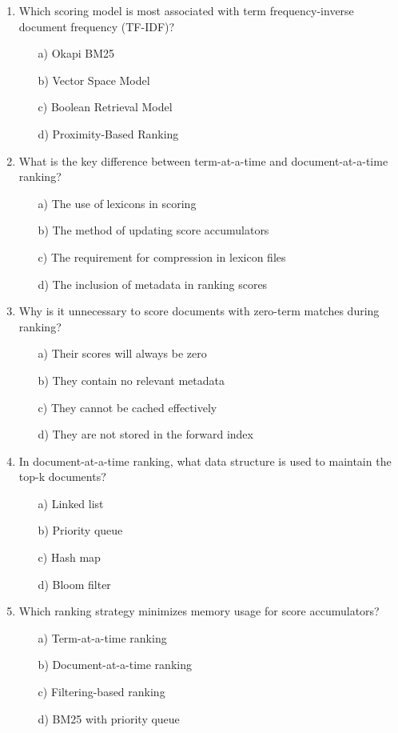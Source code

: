 \documentclass[8pt]{extarticle}
\begin{document}
\begin{multicols}{2}
\begin{enumerate}
\item Which scoring model is most associated with term frequency-inverse document frequency (TF-IDF)?
\begin{itemize}
\item[a)] Okapi BM25
\item[b)] Vector Space Model
\item[c)] Boolean Retrieval Model
\item[d)] Proximity-Based Ranking
\end{itemize}

\item What is the key difference between term-at-a-time and document-at-a-time ranking?
\begin{itemize}
\item[a)] The use of lexicons in scoring
\item[b)] The method of updating score accumulators
\item[c)] The requirement for compression in lexicon files
\item[d)] The inclusion of metadata in ranking scores
\end{itemize}

\item Why is it unnecessary to score documents with zero-term matches during ranking?
\begin{itemize}
\item[a)] Their scores will always be zero
\item[b)] They contain no relevant metadata
\item[c)] They cannot be cached effectively
\item[d)] They are not stored in the forward index
\end{itemize}

\item In document-at-a-time ranking, what data structure is used to maintain the top-k documents?
\begin{itemize}
\item[a)] Linked list
\item[b)] Priority queue
\item[c)] Hash map
\item[d)] Bloom filter
\end{itemize}

\item Which ranking strategy minimizes memory usage for score accumulators?
\begin{itemize}
\item[a)] Term-at-a-time ranking
\item[b)] Document-at-a-time ranking
\item[c)] Filtering-based ranking
\item[d)] BM25 with priority queue
\end{itemize}


\end{enumerate}
\end{multicols}
\end{document}
